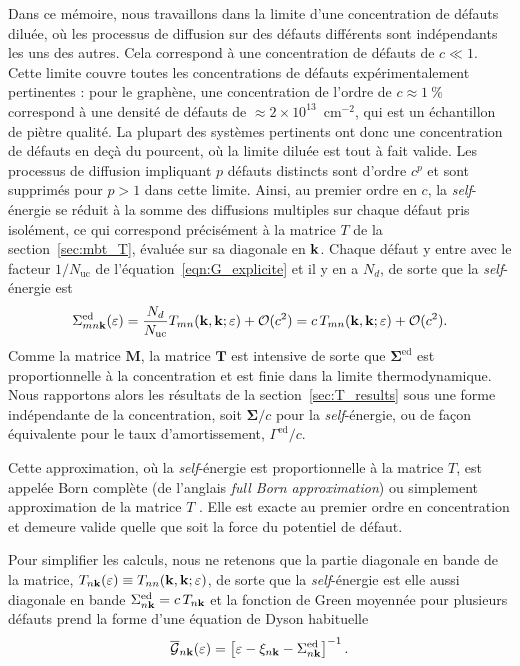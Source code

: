 Dans ce mémoire, nous travaillons dans la limite d'une concentration de défauts diluée, où les processus de diffusion sur des défauts différents sont indépendants les uns des autres. Cela correspond à une concentration de défauts de $c\ll 1$. Cette limite couvre toutes les concentrations de défauts expérimentalement pertinentes : pour le graphène, une concentration de l'ordre de $c\approx 1~\%$ correspond à une densité de défauts de $\approx 2\times 10^{13}$~cm$^{-2}$, qui est un échantillon de piètre qualité. La plupart des systèmes pertinents ont donc une concentration de défauts en deçà du pourcent, où la limite diluée est tout à fait valide. Les processus de diffusion impliquant $p$ défauts distincts sont d'ordre $c^p$ et sont supprimés pour $p>1$ dans cette limite. Ainsi, au premier ordre en $c$, la \textit{self}-énergie se réduit à la somme des diffusions multiples sur chaque défaut pris isolément, ce qui correspond précisément à la matrice $T$ de la section~\ref{sec:mbt_T}, évaluée sur sa diagonale en $\mathbf{k}$. Chaque défaut y entre avec le facteur $1/N_\text{uc}$ de l'équation~\eqref{eqn:G_explicite} et il y en a $N_d$, de sorte que la \textit{self}-énergie est~\cite{bruusManyBodyQuantumTheory2004}
\begin{equation}
    \Sigma_{mn\mathbf{k} }^\text{ed}(\varepsilon) = \frac{N_d}{N_\text{uc}} T_{mn}(\mathbf{k},\mathbf{k};\varepsilon)+\mathcal{O}(c^2) = c\,T_{mn}(\mathbf{k},\mathbf{k};\varepsilon)+\mathcal{O}(c^2).\label{eqn:sigma_diluée}
\end{equation}
Comme la matrice $\bm M$, la matrice $\bm T$ est intensive de sorte que $\bm\Sigma^\text{ed}$ est proportionnelle à la concentration et est finie dans la limite thermodynamique. Nous rapportons alors les résultats de la section~\ref{sec:T_results} sous une forme indépendante de la concentration, soit $\bm\Sigma/c$ pour la \textit{self}-énergie, ou de façon équivalente pour le taux d'amortissement, $\Gamma^\text{ed}/c$.

Cette approximation, où la \textit{self}-énergie est proportionnelle à la matrice $T$, est appelée \og Born complète \fg{} (de l'anglais \textit{full Born approximation}) ou simplement \og approximation de la matrice $T$ \fg{}. Elle est exacte au premier ordre en concentration et demeure valide quelle que soit la force du potentiel de défaut.

Pour simplifier les calculs, nous ne retenons que la partie diagonale en bande de la matrice, $T_{n\mathbf{k}}(\varepsilon)\equiv T_{nn}(\mathbf{k},\mathbf{k};\varepsilon)$, de sorte que la \textit{self}-énergie est elle aussi diagonale en bande $\Sigma^\text{ed}_{n\mathbf{k}}=c\,T_{n\mathbf{k}}$ et la fonction de Green moyennée pour plusieurs défauts prend la forme d'une équation de Dyson habituelle
\begin{equation}
    \overline{\mathcal{G}}_{n\mathbf{k}}(\varepsilon)=\left[\varepsilon-\xi_{n\mathbf{k}}-\Sigma^\text{ed}_{n\mathbf{k}}\right]^{-1}.\label{eqn:G_moyenne_diag}
\end{equation}

